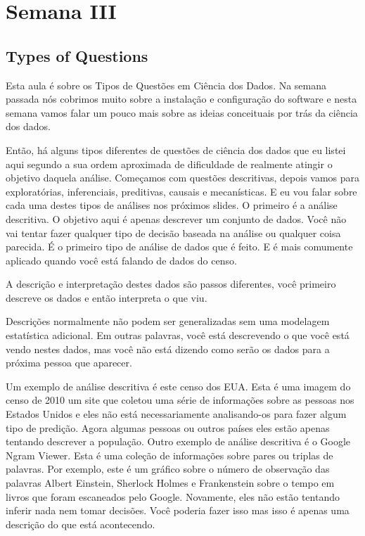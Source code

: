 \section{Semana III}


\subsection{Types of Questions}

Esta aula é sobre os Tipos de Questões em Ciência dos Dados. Na semana passada nós cobrimos muito sobre a instalação e configuração do software e nesta semana vamos falar um pouco mais sobre as ideias conceituais por trás da ciência dos dados. 

Então, há alguns tipos diferentes de questões de ciência dos dados que eu listei aqui segundo a sua ordem aproximada de dificuldade de realmente atingir o objetivo daquela análise. Começamos com questões descritivas, depois vamos para exploratórias, inferenciais, preditivas, causais e mecanísticas. E eu vou falar sobre cada uma destes tipos de análises nos próximos slides. O primeiro é a análise descritiva. O objetivo aqui é apenas descrever um conjunto de dados. Você não vai tentar fazer qualquer tipo de decisão baseada na análise ou qualquer coisa parecida. É o primeiro tipo de análise de dados que é feito. E é mais comumente aplicado quando você está falando de dados do censo. 

A descrição e interpretação destes dados são passos diferentes, você primeiro descreve os dados e então interpreta o que viu. 

Descrições normalmente não podem ser generalizadas sem uma modelagem estatística adicional. Em outras palavras, você está descrevendo o que você está vendo nestes dados, mas você não está dizendo como serão os dados para a próxima pessoa que aparecer. 

Um exemplo de análise descritiva é este censo dos EUA. Esta é uma imagem do censo de 2010 um site que coletou uma série de informações sobre as pessoas nos Estados Unidos e eles não está necessariamente analisando-os para fazer algum tipo de predição. Agora algumas pessoas ou outros países eles estão apenas tentando descrever a população. Outro exemplo de análise descritiva é o Google Ngram Viewer. Esta é uma coleção de informações sobre pares ou triplas de palavras. Por exemplo, este é um gráfico sobre o número de observação das palavras Albert Einstein, Sherlock Holmes e Frankenstein sobre o tempo em livros que foram escaneados pelo Google. Novamente, eles não estão tentando inferir nada nem tomar decisões. Você poderia fazer isso mas isso é apenas uma descrição do que está acontecendo. 

